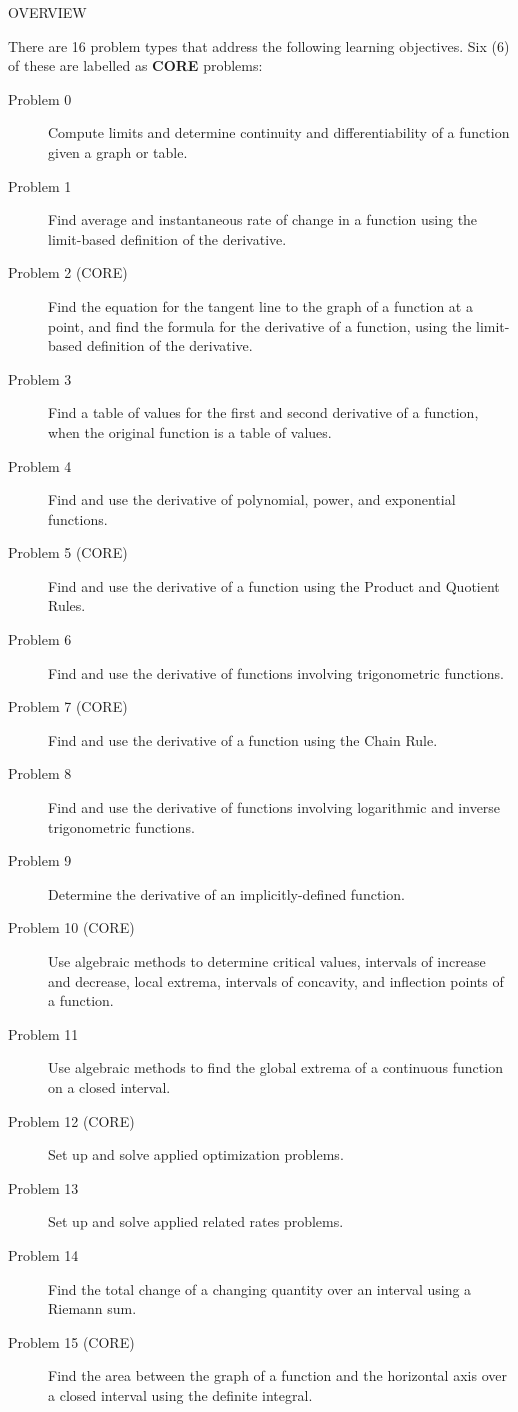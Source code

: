 \documentclass[addpoints]{exam}
\begin{document}
\begin{center}
	\begin{large}
		OVERVIEW
	\end{large}
\end{center}

\noindent
There are 16 problem types that address the following learning objectives. Six (6) of these are labelled as \textbf{CORE} problems:  
	\begin{description}
		\item[Problem 0] Compute limits and determine continuity and differentiability of a function given a graph or table. 
		\item[Problem 1] Find average and instantaneous rate of change in a function using the limit-based definition of the derivative. 
		\item[Problem 2 (CORE)] Find the equation for the tangent line to the graph of a function at a point, and find the formula for the derivative of a function, using the limit-based definition of the derivative. 
		\item[Problem 3] Find a table of values for the first and second derivative of a function, when the original function is a table of values. 
		\item[Problem 4] Find and use the derivative of polynomial, power, and exponential functions. 
		\item[Problem 5 (CORE)] Find and use the derivative of a function using the Product and Quotient Rules. 
		\item[Problem 6] Find and use the derivative of functions involving trigonometric functions. 
		\item[Problem 7 (CORE)] Find and use the derivative of a function using the Chain Rule.
		\item[Problem 8] Find and use the derivative of functions involving logarithmic and inverse trigonometric functions.
		\item[Problem 9] Determine the derivative of an implicitly-defined function. 
		\item[Problem 10 (CORE)] Use algebraic methods to determine critical values, intervals of increase and decrease, local extrema, intervals of concavity, and inflection points of a function. 
		\item[Problem 11] Use algebraic methods to find the global extrema of a continuous function on a closed interval. 
		\item[Problem 12 (CORE)] Set up and solve  applied optimization problems. 
		\item[Problem 13] Set up and solve  applied related rates problems. 
		\item[Problem 14] Find the total change of a changing quantity over an interval using a Riemann sum.
		\item[Problem 15 (CORE)] Find the area between the graph of a function and the horizontal axis over a closed interval using the definite integral. 
	\end{description}
\end{document}
